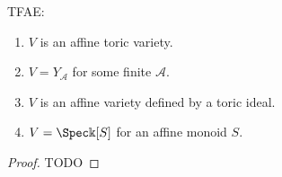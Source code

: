 \begin{theorem}
  \label{thm:1-1-17}
  TFAE:
  \begin{enumerate}
    \item $V$ is an affine toric variety.
    \item $V = Y_{\mathcal A}$ for some finite $\mathcal A$.
    \item $V$ is an affine variety defined by a toric ideal.
    \item $V = \Spec \Bbbk[S]$ for an affine monoid $S$.
  \end{enumerate}
\end{theorem}
\begin{proof}

  TODO
\end{proof}
